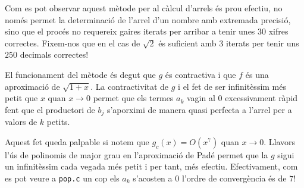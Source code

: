 \documentclass[a4paper,10.4pt]{article}
\begin{document}
Com es pot observar aquest mètode per al càlcul d'arrels és prou efectiu, no només permet la determinació de l'arrel d'un nombre amb extremada precisió, sino que el procés no requereix gaires iterats per arribar a tenir unes $30$ xifres correctes. Fixem-nos que en el cas de $\sqrt{2}$ és suficient amb $3$ iterats per tenir uns $250$ decimals correctes!

El funcionament del mètode és degut que $g$ és contractiva i que $f$ és una aproximació de $\sqrt{1+x}$. La contractivitat de $g$ i el fet de ser infinitèssim més petit que $x$ quan $x\rightarrow 0$ permet que els termes $a_k$ vagin al $0$ excessivament ràpid fent que el productori de $b_j$ s'aporximi de manera quasi perfecta a l'arrel per a valors de $k$ petits.

Aquest fet queda palpable si notem que $g_c(x)=O(x^7)$ quan $x\rightarrow 0$. Llavors l'ús de polinomis de major grau en l'aproximació de Padé permet que la $g$ sigui un infinitèssim cada vegada més petit i per tant, més efectiu. Efectivament, com es pot veure a \texttt{pop.c} un cop els $a_k$ s'acosten a $0$ l'ordre de convergència és de $7$!
\end{document}
